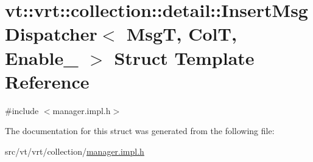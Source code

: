 \hypertarget{structvt_1_1vrt_1_1collection_1_1detail_1_1_insert_msg_dispatcher}{}\section{vt\+:\+:vrt\+:\+:collection\+:\+:detail\+:\+:Insert\+Msg\+Dispatcher$<$ MsgT, ColT, Enable\+\_\+ $>$ Struct Template Reference}
\label{structvt_1_1vrt_1_1collection_1_1detail_1_1_insert_msg_dispatcher}


{\ttfamily \#include $<$manager.\+impl.\+h$>$}



The documentation for this struct was generated from the following file\+:\begin{DoxyCompactItemize}
\item 
src/vt/vrt/collection/\hyperlink{vrt_2collection_2manager_8impl_8h}{manager.\+impl.\+h}\end{DoxyCompactItemize}
